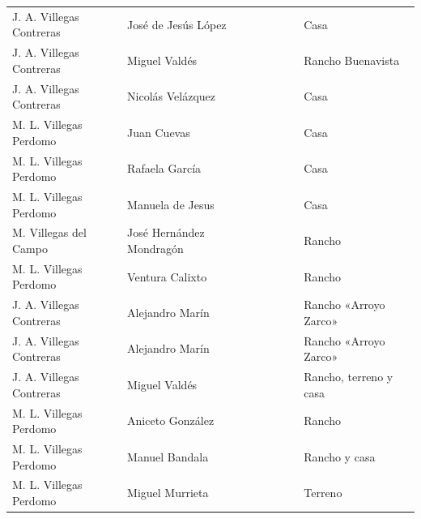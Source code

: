 \documentclass[14pt,twoside,final]{extbook} %
\begin{document}
{\begin{longtable}[c]{@{}p{2.5cm}lrSrrl@{}}
J. A. Villegas Contreras & José de Jesús López &  & {} & {} & {} & Casa \\
J. A. Villegas Contreras & Miguel Valdés &  &  &  &  & Rancho Buenavista \\
J. A. Villegas Contreras & Nicolás Velázquez &  &  &  &  & Casa \\
M. L. Villegas Perdomo & Juan Cuevas &  & {} & {} & {} & Casa \\
M. L. Villegas Perdomo & Rafaela García &  & {} & {} & {} & Casa \\
M. L. Villegas Perdomo & Manuela de Jesus &  & {} & {} & {} & Casa \\
M. Villegas del Campo & José Hernández Mondragón &  & {} & {} & {} & Rancho \\
M. L. Villegas Perdomo & Ventura Calixto &  & {} & {} & {} & Rancho \\
J. A. Villegas Contreras & Alejandro Marín &  & {} &  &  & Rancho «Arroyo Zarco» \\
J. A. Villegas Contreras & Alejandro Marín &  &  &  &  & Rancho «Arroyo Zarco» \\
J. A. Villegas Contreras & Miguel Valdés &  & {} &  &  & Rancho, terreno y casa \\
M. L. Villegas Perdomo & Aniceto González &  &  & {} & {} & Rancho \\
M. L. Villegas Perdomo & Manuel Bandala &  & {} & {} & {} & Rancho y casa \\
M. L. Villegas Perdomo & Miguel Murrieta &  & {} & {} & {} & Terreno \\

\end{longtable}}
\end{document}

